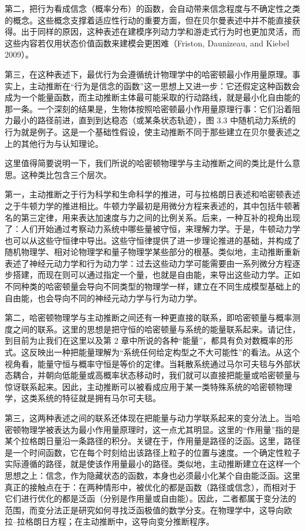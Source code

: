 第二，把行为看成信念（概率分布）的函数，会自动带来信念程度与不确定性之类的概念。这些概念支撑着适应性行动的重要方面，但在贝尔曼表述中并不能直接获得。出于同样的原因，这种表述在建模序列动力学和游走式行为时也更加灵活，而这些内容若仅用状态价值函数来建模会更困难（Friston, Daunizeau, and Kiebel 2009）。

第三，在这种表述下，最优行为会遵循统计物理学中的哈密顿最小作用量原理。事实上，主动推断在“行为是信念的函数”这一思想上又进一步：它还假定这种函数会成为一个能量函数，而主动推断主体最可能采取的行动路线，就是最小化自由能的那一条。一个深刻的结果是，生物体按照哈密顿最小作用量原理行事：它们沿着阻力最小的路径前进，直到到达稳态（或某条状态轨迹），图 3.3 中随机动力系统的行为就是例子。这是一个基础性假设，使主动推断不同于那些建立在贝尔曼表述之上的其他行为与认知理论。

这里值得简要说明一下，我们所说的哈密顿物理学与主动推断之间的类比是什么意思。这种类比包含三个层次。

第一，主动推断之于行为科学和生命科学的推进，可与拉格朗日表述和哈密顿表述之于牛顿力学的推进相比。牛顿力学最初是用微分方程来表述的，其中包括牛顿著名的第三定律，用来表达加速度与力之间的比例关系。后来，一种互补的视角出现了：人们开始通过考察动力系统中哪些量被守恒，来理解力学。于是，牛顿动力学也可以从这些守恒律中导出。这些守恒律提供了进一步理论推进的基础，并构成了随机物理学、相对论物理学和量子物理学某些部分的根基。类似地，主动推断重新表述了神经元动力学和行为动力学：过去这些动力学可能需要由一系列微分方程逐步搭建，而现在则可以通过指定一个量，也就是自由能，来导出这些动力学。正如不同种类的哈密顿量会导向不同类型的物理学一样，建立在不同生成模型基础上的自由能，也会导向不同的神经元动力学与行为动力学。

第二，哈密顿物理学与主动推断之间还有一种更直接的联系，即哈密顿量与概率测度之间的联系。这里的思想是把守恒的哈密顿量与系统的能量联系起来。请记住，到目前为止我们在这里以及第 2 章中所说的各种“能量”，都具有负对数概率的形式。这反映出一种把能量理解为“系统任何给定构型之不大可能性”的看法。从这个视角看，能量守恒与概率守恒是等价的定律。当耗散系统通过马尔可夫毯与外部状态耦合，并朝向低能量或高概率状态移动时，我们就可以直接把能量或哈密顿量与惊讶联系起来。因此，主动推断可以被看成应用于某一类特殊系统的哈密顿物理学，这类系统的特征就是拥有马尔可夫毯。

第三，这两种表述之间的联系还体现在把能量与动力学联系起来的变分法上。当哈密顿物理学被表达为最小作用量原理时，这一点尤其明显。这里的“作用量”指的是某个拉格朗日量沿一条路径的积分。关键在于，作用量是路径的泛函。这里，路径是一个时间函数，它在每个时刻给出该路径上粒子的位置与速度。一个确定性粒子实际遵循的路径，就是使该作用量最小的路径。类似地，主动推断建立在这样一个思想之上：信念，作为隐藏状态的函数，本身也必须最小化某个自由能泛函。这里真正的接触点在于：在两种情形中，被优化的都是函数（路径或信念），而相对于它们进行优化的都是泛函（分别是作用量或自由能）。因此，二者都属于变分法的范围，而变分法正是研究如何寻找泛函极值的数学分支。在物理学中，这导向欧拉--拉格朗日方程；在主动推断中，这导向变分推断程序。


